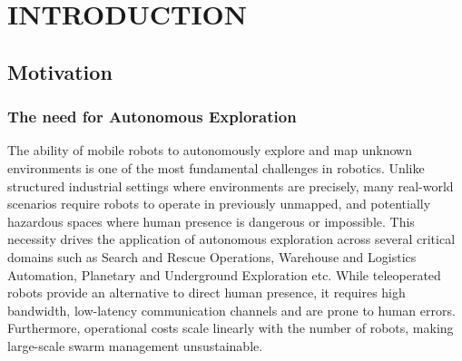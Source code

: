\documentclass[11pt]{article}
\begin{document}
\begin{abstract}
		
		\vspace{0.5em}
		\noindent
		The navigation module enables autonomous exploration through frontier
		detection and path planning. Frontiers are identified by computing the
		convex hull of known map and sampling the boundary as potential
		exploration goals. The RRT* algorithm plans collision-free paths to
		selected frontiers, whereas a pure pursuit controller tracks the planned paths.
		
		\vspace{0.5em}
		\noindent
		The system is implemented as a ROS 2 node in Python, tested on TurtleBot3 in structured indoor environments. Performance is assessed using the absolute trajectory error (ATE), landmark map confidence, and point cloud quality.
				
			
		\vspace{0.5em}
		\noindent
		Keywords: SLAM, Extended Kalman Filter, Feature-Based Mapping, Landmark Extraction, ICP Alignment, RRT*, ROS2, Frontier-Based Exploration, 2D LiDAR Mapping, Cramér-Rao Lower Bound
	\end{abstract}
	
	\newpage
	\tableofcontents
	\newpage
	
	\setlength{\parindent}{0pt} %
	\setlength{\parskip}{0.5em} %
	\pagebreak
	\section{INTRODUCTION}
	
	\subsection{Motivation}
	
	\subsubsection{The need for Autonomous Exploration}
	
	The ability of mobile robots to autonomously explore and map unknown environments is one of the most fundamental challenges in robotics. Unlike structured industrial settings where environments are precisely, many real-world scenarios require robots to operate in previously unmapped, and potentially hazardous spaces where human presence is dangerous or impossible. This necessity drives the application of autonomous exploration across several critical domains such as Search and Rescue Operations, Warehouse and Logistics Automation, Planetary and Underground Exploration etc. While teleoperated robots provide an alternative to direct human presence, it requires  high bandwidth, low-latency communication channels and are prone to human errors. Furthermore, operational costs scale linearly with the number of robots, making large-scale swarm management unsustainable.
	
\end{document}
